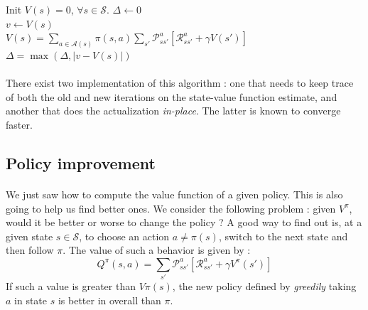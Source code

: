 \documentclass[a4paper]{article}
\begin{document}
{{			
			{
				\begin{algorithm}[H]
	 				\SetAlgoLined
					\LinesNumbered
					Init $V(s) = 0$, $\forall{s}\in\mathcal{S}$. 
					\Begin
					{
						{
							$\Delta \leftarrow 0$ \\
							{
									$v\leftarrow V(s)$ \\
									$V(s) = \sum_{a\in\mathcal{A}(s)} \pi(s,a) \sum_{s'} \mathcal{P}_{ss'}^a \left[ \mathcal{R}_{ss'}^a + \gamma V(s')\right] $ \\
									$ \Delta = \max{\left(\Delta, \vert v - V(s)\vert \right)}$
							}
						}
					}
				\end{algorithm}
			}
			
			\paragraph{} There exist two implementation of this algorithm : one that needs to keep trace of both the old and new iterations on the state-value function estimate, and another that does the actualization \emph{in-place}. The latter is known to converge faster. 
		}
		
		\subsection{Policy improvement}
		{
			\paragraph{} We just saw how to compute the value function of a given policy. This is also going to help us find better ones. We consider the following problem : given $V^\pi$, would it be better or worse to change the policy ? A good way to find out is, at a given state $s\in\mathcal{S}$, to choose an action $a \neq \pi(s)$, switch to the next state and then follow $\pi$. The value of such a behavior is given by : 
			\begin{equation}
				Q^\pi(s,a) = \sum_{s'}\mathcal{P}_{ss'}^a \left[ \mathcal{R}_{ss'}^a + \gamma V^\pi(s')\right]
			\end{equation}
			If such a value is greater than $V\pi(s)$, the new policy defined by \emph{greedily} taking $a$ in state $s$ is better in overall than $\pi$. 
			
}}
\end{document}
